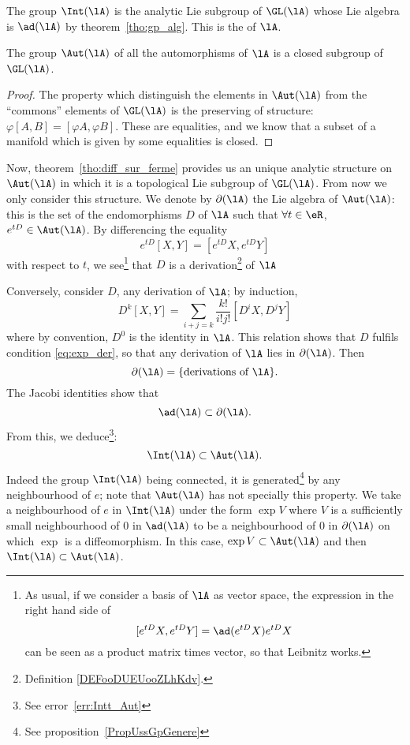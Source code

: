 The group $\Int(\lA)$ is the analytic Lie subgroup of $\GL(\lA)$ whose Lie algebra is $\ad(\lA)$ by theorem~\ref{tho:gp_alg}. This is the  of $\lA$.

\begin{proposition}
The group $\Aut(\lA)$ of all the automorphisms of $\lA$ is a closed subgroup of $\GL(\lA)$.
\end{proposition}

\begin{proof}
The property which distinguish the elements in $\Aut(\lA)$ from the ``commons'' elements of $\GL(\lA)$ is the preserving of structure: $\varphi[A,B]=[\varphi A,\varphi B]$. These are equalities, and we know that a subset of a manifold which is given by some equalities is closed.
\end{proof}

Now, theorem~\ref{tho:diff_sur_ferme} provides us an unique analytic structure on $\Aut(\lA)$ in which it is a topological Lie subgroup of $\GL(\lA)$. From now we only consider this structure. We denote by $\partial(\lA)$ the Lie algebra of $\Aut(\lA)$: this is the set of the endomorphisms $D$ of $\lA$ such that $\forall t\in\eR$, $e^{tD}\in\Aut(\lA)$. By differencing the equality
\begin{equation}\label{eq:exp_der}
  e^{tD}[X,Y]=[e^{tD}X,e^{tD}Y]
\end{equation}
with respect to $t$, we see\footnote{As usual, if we consider a basis of $\lA$ as vector space, the expression in the right hand side of \[[e^{tD}X,e^{tD}Y]=\ad(e^{tD}X)e^{tD}X\] can be seen as a product matrix times vector, so that Leibnitz works.} that $D$ is a derivation\footnote{Definition \ref{DEFooDUEUooZLhKdv}.} of \( \lA\)

Conversely, consider $D$, any derivation of $\lA$; by induction,
\begin{equation}
   D^k[X,Y]=\sum_{i+j=k}\frac{k!}{i!j!}[D^iX,D^jY]
\end{equation}
where by convention, $D^0$ is the identity in $\lA$. This relation shows that $D$ fulfils condition \eqref{eq:exp_der}, so that any derivation of $\lA$ lies in $\partial(\lA)$. Then
\[
  \partial(\lA)=\{\text{derivations of }\lA\}.
\]
The Jacobi identities show that
\[
\ad(\lA)\subset\partial(\lA).    \label{pg:ad_subset_der}
\]
From this, we deduce\footnote{See error~\ref{err:Intt_Aut}}: 
\begin{equation}\label{eq:int_sub_aut}
  \Int(\lA)\subset\Aut(\lA).
\end{equation}
Indeed the group $\Int(\lA)$ being connected, it is generated\footnote{See proposition~\ref{PropUssGpGenere}} by any neighbourhood of $e$; note that $\Aut(\lA)$ has not specially this property. We take a neighbourhood of $e$ in $\Int(\lA)$ under the form  $\exp V$  where $V$ is a sufficiently small neighbourhood of $0$ in $\ad(\lA)$ to be a neighbourhood of $0$ in $\partial(\lA)$ on which $\exp$ is a diffeomorphism. In this case, $\exp V\subset\Aut(\lA)$ and then $\Int(\lA)\subset\Aut(\lA)$.

